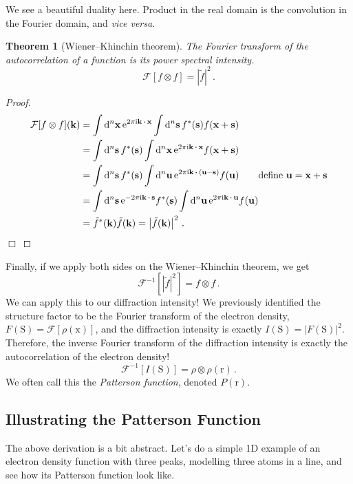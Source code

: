 \documentclass{article}
\theoremstyle{plain}\theoremheaderfont{\normalfont\itshape}\theorembodyfont{\rmfamily}\theoremseparator{.}\newtheorem*{rem}{Remark}\newtheorem*{ex}{Example}\newtheorem*{proof}{Proof}\newtheorem*{altp}{Alternative proof}
\theoremstyle{plain}\theoremheaderfont{\normalfont\bfseries}\theorembodyfont{\rmfamily}\theoremseparator{.}\newtheorem{thm}{Theorem}[section]\newtheorem{lem}[thm]{Lemma}\newtheorem{prop}[thm]{Proposition}\newtheorem*{cor}{Corollary}\newtheorem{defn}[thm]{Definition}\newtheorem{clm}[thm]{Claim}\newtheorem{clminproof}{Claim}\newtheorem*{law}{Law}\newtheorem{pos}[thm]{Postulate}
\theoremstyle{break}\theoremheaderfont{\normalfont\itshape}\theorembodyfont{\rmfamily}\theoremseparator{.\medskip}\newtheorem*{proofskip}{Proof}\newtheorem*{exs}{Examples}\newtheorem*{rems}{Remarks}
\theoremstyle{break}\theoremheaderfont{\normalfont\bfseries}\theorembodyfont{\rmfamily}\theoremseparator{.\medskip}\newtheorem{lemskip}[thm]{Lemma}\newtheorem{defnskip}[thm]{Definition}\newtheorem{propskip}[thm]{Proposition}\newtheorem{thmskip}[thm]{Theorem}
\numberwithin{equation}{section}
\newcommand{\qed}{\hfill\ensuremath{\Box}}
\newcommand{\ii}{\mathrm{i}}
\newcommand{\ee}{\mathrm{e}}
\newcommand{\dd}[2][]{\mathrm{d}^{#1} #2\,}
\newcommand{\vb}[1]{\bm{\mathrm{#1}}}
\newcommand{\vdot}{\,\bm{\mathrm{\cdot}}\,}
\newcommand{\abs}[1]{\left| #1 \right|}
\begin{document}
    We see a beautiful duality here. Product in the real domain is the convolution in the Fourier domain, and \textit{vice versa}.
    \begin{thm}[Wiener--Khinchin theorem]
        The Fourier transform of the autocorrelation of a function is its \textit{power spectral intensity}.
        \begin{equation}
            \mathcal{F}[f\otimes f]=\abs{\tilde{f}}^2\,.
        \end{equation}
    \end{thm}
    \begin{proof}
        \begin{align}
            \mathcal{F}[f\otimes f](\vb{k})&=\int\dd[n]{\vb{x}}\ee^{2\pi \ii\vb{k}\vdot\vb{x}}\int\dd[n]{\vb{s}}f^*(\vb{s})f(\vb{x}+\vb{s})\notag\\
            &=\int\dd[n]{\vb{s}}f^*(\vb{s})\int\dd[n]{\vb{x}}\ee^{2\pi \ii\vb{k}\vdot\vb{x}}f(\vb{x}+\vb{s})\notag\\
            &=\int\dd[n]{\vb{s}}f^*(\vb{s})\int\dd[n]{\vb{u}}\ee^{2\pi \ii\vb{k}\vdot(\vb{u}-\vb{s})}f(\vb{u}) \qquad\text{define }\vb{u}=\vb{x}+\vb{s}\notag \\
            &=\int\dd[n]{\vb{s}}\ee^{-2\pi \ii\vb{k}\vdot\vb{s}}f^*(\vb{s})\int\dd[n]{\vb{u}}\ee^{2\pi \ii\vb{k}\vdot\vb{u}}f(\vb{u})\notag \\
            &=\tilde{f}^*(\vb{k})\tilde{f}(\vb{k})=\abs{\tilde{f}(\vb{k})}^2\,.
        \end{align}\qed
    \end{proof}
    Finally, if we apply both sides on the Wiener--Khinchin theorem, we get
    \begin{equation}
        \mathcal{F}^{-1}\left[|\tilde{f}|^2\right]=f\otimes f\,.
    \end{equation}
    We can apply this to our diffraction intensity! We previously identified the structure factor to be the Fourier transform of the electron density, \(F(\vb{S})=\mathcal{F}[\rho(\vb{x})]\), and the diffraction intensity is exactly \(I(\vb{S})=\abs{F(\vb{S})}^2\). Therefore, the inverse Fourier transform of the diffraction intensity is exactly the autocorrelation of the electron density!
    \begin{equation}
        \mathcal{F}^{-1}[I(\vb{S})]=\rho\otimes\rho(\vb{r})\,.
    \end{equation}
    We often call this the \textit{Patterson function}, denoted \(P(\vb{r})\).

    \subsection{Illustrating the Patterson Function}
    The above derivation is a bit abstract. Let's do a simple 1D example of an electron density function with three peaks, modelling three atoms in a line, and see how its Patterson function look like.
\end{document}

